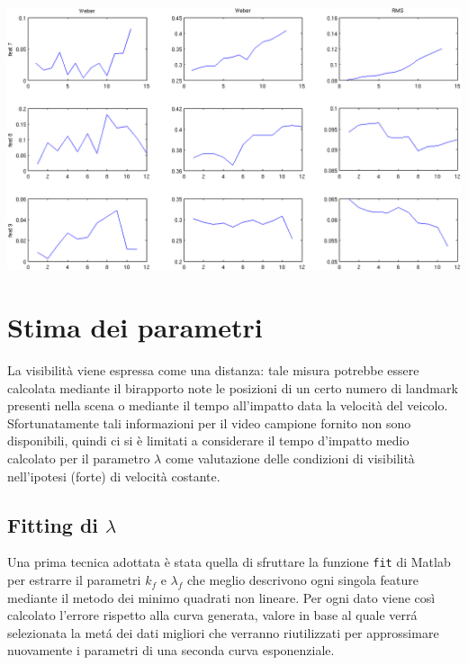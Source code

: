\documentclass[12pt]{report}
\begin{document}
\begin{center}
	\includegraphics[scale=0.7, angle=90.0]{images/compContr3.png}
	\label{fig:contr03}
\end{center}




\section{Stima dei parametri}

\noindent La visibilit\`a viene espressa come una distanza: tale misura potrebbe essere calcolata mediante il birapporto note le posizioni di un certo numero di landmark presenti nella scena o mediante il tempo all'impatto data la velocit\`a del veicolo. Sfortunatamente tali informazioni per il video campione fornito non sono disponibili, quindi ci si \`e limitati a considerare il tempo d'impatto medio calcolato per il parametro $\lambda$ come valutazione delle condizioni di visibilit\`a nell'ipotesi (forte) di velocit\`a costante.\\

\subsection{Fitting di $\lambda$}

\noindent Una prima tecnica adottata \`e stata quella di sfruttare la funzione \verb|fit| di Matlab per estrarre il parametri $k_f$ e $\lambda_f$ che meglio descrivono ogni singola feature mediante il metodo dei minimo quadrati non lineare. Per ogni dato viene cos\`i calcolato l'errore rispetto alla curva generata, valore in base al quale verr\'a selezionata la met\'a dei dati migliori che verranno riutilizzati per approssimare nuovamente i parametri di una seconda curva esponenziale.\\
\end{document}
